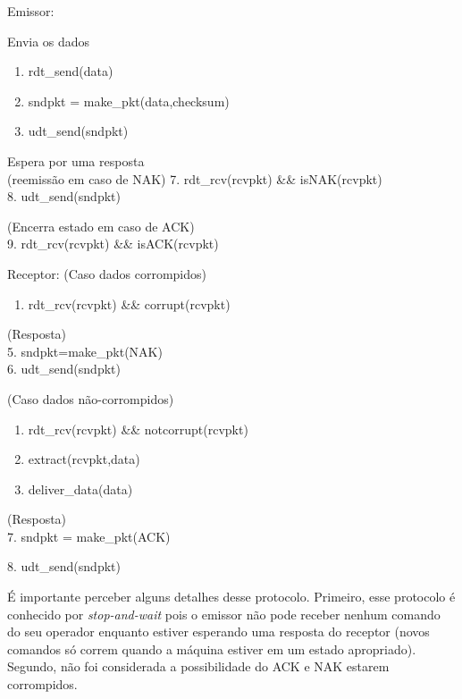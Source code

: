 Emissor:

Envia os dados

\begin{enumerate}
\def\labelenumi{\arabic{enumi}.}
\tightlist
\item
  rdt\_send(data)
\item
  sndpkt = make\_pkt(data,checksum)
\item
  udt\_send(sndpkt)
\end{enumerate}

Espera por uma resposta\\
(reemissão em caso de NAK) 7. rdt\_rcv(rcvpkt) \&\& isNAK(rcvpkt)  \\
8. udt\_send(sndpkt)

(Encerra estado em caso de ACK)\\
9. rdt\_rcv(rcvpkt) \&\& isACK(rcvpkt)

Receptor: (Caso dados corrompidos)

\begin{enumerate}
\def\labelenumi{\arabic{enumi}.}
\setcounter{enumi}{3}
\tightlist
\item
  rdt\_rcv(rcvpkt) \&\& corrupt(rcvpkt)
\end{enumerate}

(Resposta)\\
5. sndpkt=make\_pkt(NAK) \\
6. udt\_send(sndpkt)

(Caso dados não-corrompidos)

\begin{enumerate}
\def\labelenumi{\arabic{enumi}.}
\setcounter{enumi}{3}
\tightlist
\item
  rdt\_rcv(rcvpkt) \&\& notcorrupt(rcvpkt)
\item
  extract(rcvpkt,data)
\item
  deliver\_data(data)
\end{enumerate}

(Resposta)\\
7. sndpkt = make\_pkt(ACK) 

8. udt\_send(sndpkt)

É importante perceber alguns detalhes desse protocolo. Primeiro, esse
protocolo é conhecido por \emph{stop-and-wait} pois o emissor não pode
receber nenhum comando do seu operador enquanto estiver esperando uma
resposta do receptor (novos comandos só correm quando a máquina estiver
em um estado apropriado). Segundo, não foi considerada a possibilidade
do ACK e NAK estarem corrompidos.

